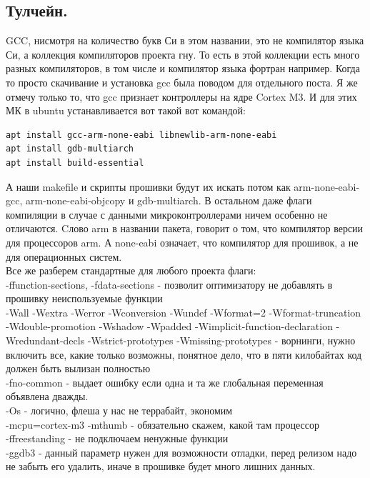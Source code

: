 \documentclass[12pt,a4paper]{article}
\begin{document}
\subsection{Тулчейн.}
    GCC, нисмотря на количество букв Си в этом названии, это не компилятор
    языка Си, а коллекция компиляторов проекта гну. То есть в этой коллекции есть много
    разных компиляторов, в том числе и компилятор языка фортран например.
    Когда то просто скачивание и установка gcc была поводом для отдельного поста.
    Я же отмечу только то, что gcc признает контроллеры на ядре Cortex M3. И
    для этих МК в ubuntu устанавливается вот такой вот командой:
\begin{lstlisting}
apt install gcc-arm-none-eabi libnewlib-arm-none-eabi
apt install gdb-multiarch
apt install build-essential
\end{lstlisting}
    А наши makefile и скрипты прошивки будут их искать потом как
    arm-none-eabi-gcc, arm-none-eabi-objcopy и gdb-multiarch.
    В остальном даже флаги компиляции в случае с данными микроконтроллерами
    ничем особенно не отличаются. Cлово arm в названии пакета, говорит о том, что
    компилятор версии для процессоров arm. А none-eabi означает, что компилятор
    для прошивок, а не для операционных систем.\\
    Все же разберем стандартные для любого проекта флаги:\\
    -ffunction-sections, -fdata-sections - позволит оптимизатору не добавлять в
    прошивку неиспользуемые функции\\
    -Wall -Wextra -Werror -Wconversion -Wundef -Wformat=2 -Wformat-truncation
    -Wdouble-promotion -Wshadow -Wpadded -Wimplicit-function-declaration
    -Wredundant-decls -Wstrict-prototypes -Wmissing-prototypes
    - ворнинги, нужно включить все, какие только возможны,
    понятное дело, что в пяти килобайтах код должен быть вылизан полностью\\
    -fno-common - выдает ошибку если одна и та же глобальная переменная
    объявлена дважды.\\
    -Os - логично, флеша у нас не террабайт, экономим\\
    -mcpu=cortex-m3 -mthumb - обязательно скажем, какой там процессор\\
    -ffreestanding - не подключаем ненужные функции\\
    -ggdb3 - данный параметр нужен для возможности отладки, перед релизом надо
    не забыть его удалить, иначе в прошивке будет много лишних данных.
\end{document}
